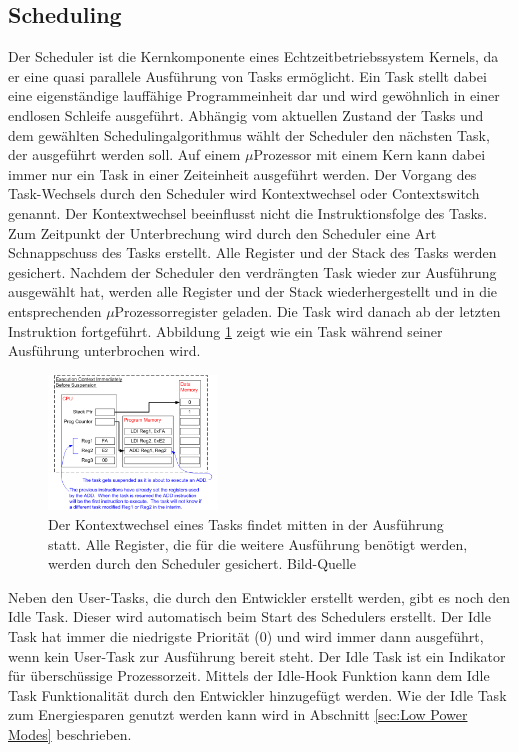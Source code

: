 \subsection{Scheduling}
\label{Scheduling}
Der Scheduler ist die Kernkomponente eines Echtzeitbetriebssystem Kernels, da er eine quasi parallele Aus\-füh\-rung von Tasks ermöglicht. Ein Task stellt dabei eine ei\-gen\-stän\-di\-ge lauffähige Programmeinheit dar und wird ge\-wöhn\-lich in einer endlosen Schleife ausgeführt. Abhängig vom aktuellen Zustand der Tasks und dem gewählten Scheduling\-algorithmus wählt der Scheduler den nächsten Task, der ausgeführt werden soll. Auf einem $\mu$\-Pro\-zesso\-r mit einem Kern kann dabei immer nur ein Task in einer Zeiteinheit ausgeführt werden. Der Vorgang des Task-Wechsels durch den Scheduler wird Kontextwechsel oder Contextswitch genannt. Der Kontextwechsel beeinflusst nicht die Instruktionsfolge des Tasks. Zum Zeitpunkt der Unterbrechung wird durch den Scheduler eine Art Schnappschuss des Tasks erstellt. Alle Register und der Stack des Tasks werden gesichert. Nachdem der Scheduler den verdrängten Task wieder zur Aus\-füh\-rung ausgewählt hat, werden alle Register und der Stack wiederhergestellt und in die entsprechenden $\mu$\-Pro\-zes\-sor\-re\-gis\-ter geladen. Die Task wird danach ab der letzten Instruktion fortgeführt. Abbildung \ref{fig:ContextSwitch} zeigt wie ein Task während seiner Ausführung unterbrochen wird.
\begin{figure}[ht!]
	\centering
		\includegraphics[width=0.4\textwidth]{Pictures/FreeRTOSOrg/ExeContext.png}
	\caption{Der Kontextwechsel eines Tasks findet mitten in der Aus\-füh\-rung statt. Alle Register, die für die weitere Ausführung benötigt werden, werden durch den Scheduler gesichert. Bild-Quelle~\protect{} }
	\label{fig:ContextSwitch}
\end{figure}
\newline
Neben den User-Tasks, die durch den Entwickler erstellt werden, gibt es noch den Idle Task. Dieser wird automatisch beim Start des Schedulers erstellt. Der Idle Task hat immer die niedrigste Priorität (0) und wird immer dann ausgeführt, wenn kein User-Task zur Aus\-füh\-rung bereit steht. Der Idle Task ist ein Indikator für über\-schüss\-ige Prozessorzeit. Mittels der Idle-Hook Funktion kann dem Idle Task Funktionalität durch den Entwickler hinzugefügt werden. Wie der Idle Task zum Energiesparen genutzt werden kann wird in Abschnitt \ref{sec:Low Power Modes} beschrieben.
